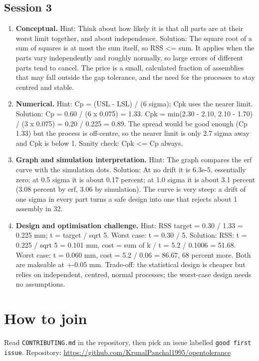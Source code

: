 \documentclass[11pt,a4paper]{article}
\begin{document}
\subsection*{Session 3}
\begin{enumerate}[nosep]
\item \textbf{Conceptual.} Hint: Think about how likely it is that all parts are at their worst limit together, and about independence. Solution: The square root of a sum of squares is at most the sum itself, so RSS \textless{}= sum. It applies when the parts vary independently and roughly normally, so large errors of different parts tend to cancel. The price is a small, calculated fraction of assemblies that may fall outside the gap tolerance, and the need for the processes to stay centred and stable.
\item \textbf{Numerical.} Hint: Cp = (USL - LSL) / (6 sigma); Cpk uses the nearer limit. Solution: Cp = 0.60 / (6 x 0.075) = 1.33. Cpk = min(2.30 - 2.10, 2.10 - 1.70) / (3 x 0.075) = 0.20 / 0.225 = 0.89. The spread would be good enough (Cp 1.33) but the process is off-centre, so the nearer limit is only 2.7 sigma away and Cpk is below 1. Sanity check: Cpk \textless{}= Cp always.
\item \textbf{Graph and simulation interpretation.} Hint: The graph compares the erf curve with the simulation dots. Solution: At no drift it is 6.3e-5, essentially zero; at 0.5 sigma it is about 0.17 percent; at 1.0 sigma it is about 3.1 percent (3.08 percent by erf, 3.06 by simulation). The curve is very steep: a drift of one sigma in every part turns a safe design into one that rejects about 1 assembly in 32.
\item \textbf{Design and optimisation challenge.} Hint: RSS target = 0.30 / 1.33 = 0.225 mm; t = target / sqrt 5. Worst case: t = 0.30 / 5. Solution: RSS: t = 0.225 / sqrt 5 = 0.101 mm, cost = sum of k / t = 5.2 / 0.1006 = 51.68. Worst case: t = 0.060 mm, cost = 5.2 / 0.06 = 86.67, 68 percent more. Both are makeable at +-0.05 mm. Trade-off: the statistical design is cheaper but relies on independent, centred, normal processes; the worst-case design needs no assumptions.
\end{enumerate}

\section{How to join}
Read \texttt{CONTRIBUTING.md} in the repository, then pick an issue labelled \texttt{good first issue}. Repository: \url{https://github.com/KrunalPanchal1995/opentolerance}
\end{document}
